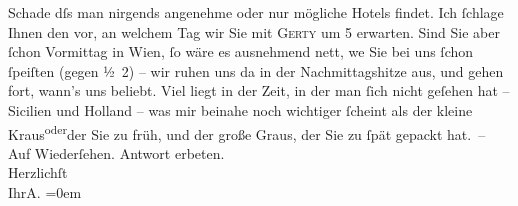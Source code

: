 \begin{ledgroupsized}[t]{13cm}
               Schade dſs man nirgends angenehme oder nur mögliche Hotels findet. Ich ſchlage Ihnen
               den \label{K_L01407_1v}\label{K_L01407_1h} vor, an
               welchem Tag wir Sie mit \textsc{Gerty} um 5 erwarten. Sind Sie aber {\pb}ſchon
                  Vormittag in Wien, ſo wäre es
               ausnehmend nett, we{\geminationn}{ }Sie bei uns ſchon ſpeiſten (gegen ½ 2)
               – wir ruhen uns da{\geminationn} in der Nachmittagshitze aus, und
               gehen fort, wann’s uns beliebt. Viel liegt in der Zeit, in der man ſich nicht geſehen
               hat – Sicilien und Holland – was mir beinahe noch wichtiger ſcheint als der kleine Kraus\substVorne{}\textsuperscript{oder}\substDazwischen{}der Sie zu früh, und\substHinten{} der große Graus, der Sie zu ſpät gepackt hat. –\pend
           \pstart
           Auf Wiederſehen. Antwort erbeten.{\\[\baselineskip]}Herzlichſt{\\[\baselineskip]}Ihr\spacefill\mbox{A.}\pend
           \leftskip=0em{}\endnumbering{}\end{ledgroupsized}  \newcommand{\dateiname}{L01407}\newcommand{\titel}{Arthur Schnitzler an Hugo von Hofmannsthal, [19.? 6. 1904]}\newcommand{\editorInnen}{Martin Anton Müller und Gerd-Hermann Susen}
      